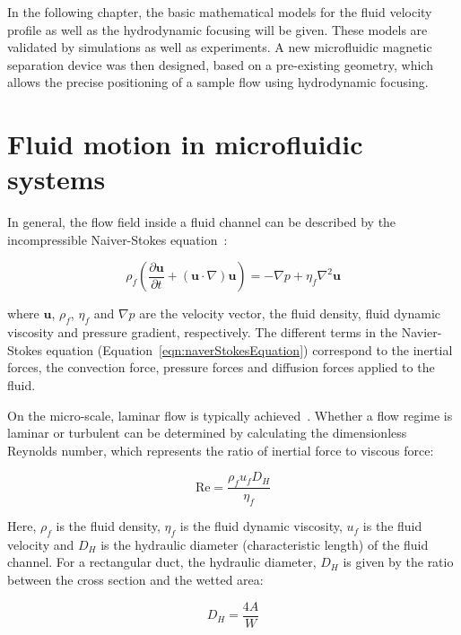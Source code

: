 In the following chapter, the basic mathematical models for the fluid velocity profile as well as the hydrodynamic focusing will be given. These models are validated by simulations as well as experiments. A new microfluidic magnetic separation device was then designed, based on a pre-existing geometry, which allows the precise positioning of a sample flow using hydrodynamic focusing. 

\section{Fluid motion in microfluidic systems}
In general, the flow field inside a fluid channel can be described by the incompressible Naiver-Stokes equation~\cite{Happel2012}:

\begin{equation}
	\rho_{f} \left( \frac{\partial\mathbf{u}}{\partial t} + (\mathbf{u}\cdot\nabla)\mathbf{u} \right) = -\nabla p + \eta_{f} \nabla^{2}\mathbf{u}
	\label{eqn:naverStokesEquation}
\end{equation}

where $\mathbf{u}$, $\rho_{f}$, $\eta_{f}$ and $\nabla p$ are the velocity vector, the fluid density, fluid dynamic viscosity and pressure gradient, respectively. The different terms in the Navier-Stokes equation (Equation~\ref{eqn:naverStokesEquation}) correspond to the inertial forces, the convection force, pressure forces and diffusion forces applied to the fluid.

On the micro-scale, laminar flow is typically achieved~\cite{Whitesides2006}. Whether a flow regime is laminar or turbulent can be determined by calculating the dimensionless Reynolds number, which represents the ratio of inertial force to viscous force:

\begin{equation}
	\text{Re} = \frac{\rho_{f}u_{f}D_{H}}{\eta_{f}}
 	\label{eqn:reynoldsNumber}
\end{equation}

Here, $\rho_{f}$ is the fluid density, $\eta_{f}$ is the fluid dynamic viscosity, $u_{f}$ is the fluid velocity and $D_{H}$ is the hydraulic diameter (characteristic length) of the fluid channel. For a rectangular duct, the hydraulic diameter, $D_{H}$ is given by the ratio between the cross section and the wetted area: 

\begin{equation}
 	D_{H} = \frac{4A}{W}
\end{equation}

